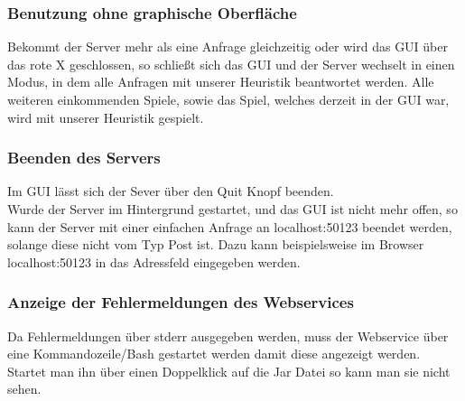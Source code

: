 \documentclass{article}
\newcommand{\gquote}[1]{\glqq #1\grqq} %
\begin{document}
\subsubsection{Benutzung ohne graphische Oberfläche}
Bekommt der Server mehr als eine Anfrage gleichzeitig oder wird das GUI über das rote X geschlossen, so schließt sich das GUI und der Server wechselt in einen Modus, in dem alle Anfragen mit unserer Heuristik beantwortet werden. Alle weiteren einkommenden Spiele, sowie das Spiel, welches derzeit in der GUI war, wird mit unserer Heuristik gespielt.
\subsubsection{Beenden des Servers}
Im GUI lässt sich der Sever über den \gquote{Quit} Knopf beenden.\\
Wurde der Server im Hintergrund gestartet, und das GUI ist nicht mehr offen, so kann der Server mit einer einfachen Anfrage an localhost:50123 beendet werden, solange diese nicht vom Typ Post ist. Dazu kann beispielsweise im Browser localhost:50123 in das Adressfeld eingegeben werden.
\subsubsection{Anzeige der Fehlermeldungen des Webservices}
Da Fehlermeldungen über \gquote{stderr} ausgegeben werden, muss der Webservice über eine Kommandozeile/Bash gestartet werden damit diese angezeigt werden. Startet man ihn über einen Doppelklick auf die Jar Datei so kann man sie nicht sehen.
\end{document}
